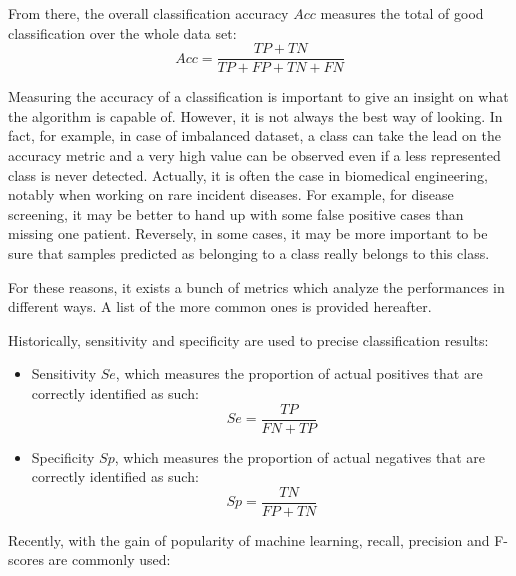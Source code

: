 \documentclass[a4paper,10pt]{article}
\begin{document}
From there, the overall classification accuracy $Acc$ measures the total of good classification over the whole data set:
\begin{equation}
Acc = \frac{TP+TN}{TP+FP+TN+FN}
\end{equation}

Measuring the accuracy of a classification is important to give an insight on what the algorithm is capable of. However, it is not always the best way of looking. In fact, for example, in case of imbalanced dataset, a class can take the lead on the accuracy metric and a very high value can be observed even if a less represented class is never detected. Actually, it is often the case in biomedical engineering, notably when working on rare incident diseases. For example, for disease screening, it may be better to hand up with some false positive cases than missing one patient.
Reversely, in some cases, it may be more important to be sure that samples predicted as belonging to a class really belongs to this class.

For these reasons, it exists a bunch of metrics which analyze the performances in different ways. A list of the more common ones is provided hereafter.

Historically, sensitivity and specificity are used to precise classification results:
\begin{itemize}
\item Sensitivity $Se$, which measures the proportion of actual positives that are correctly identified as such:
\begin{equation}
Se = \frac{TP}{FN+TP}
\end{equation}
\item Specificity $Sp$, which measures the proportion of actual negatives that are correctly identified as such:
\begin{equation}
Sp = \frac{TN}{FP+TN}
\end{equation}
\end{itemize}

Recently, with the gain of popularity of machine learning, recall, precision and F-scores are commonly used:
\end{document}
